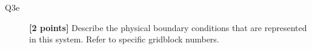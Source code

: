 \documentclass{article}
\begin{document}
\begin{description}
\item [Q3e]  \textbf{[2 points]}  Describe the physical boundary conditions that are represented in this system. Refer to specific gridblock numbers.
\vspace{2.0cm}



\end{description}

\end{document}
